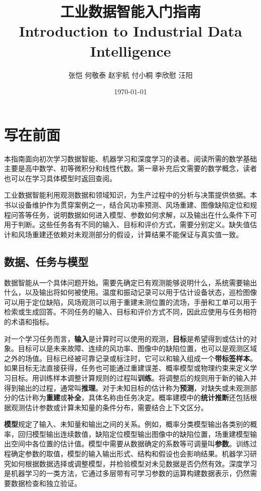 \documentclass[UTF8,11pt,zihao=false,linespread=1.3,openany]{ctexbook}
\title{工业数据智能入门指南 \\ Introduction to Industrial Data Intelligence}
\author{张恺 \quad 何敬泰 \quad 赵宇航 \quad 付小桐 \quad 李欣慰 \quad 汪阳}
\date{\today}
\begin{document}
\maketitle
\frontmatter
\tableofcontents
\chapter*{写在前面}
本指南面向初次学习数据智能、机器学习和深度学习的读者。阅读所需的数学基础主要是高中数学、初等微积分和线性代数。第一章补充后文需要的数学概念，读者也可以在学习具体模型时返回查阅。

工业数据智能利用观测数据和领域知识，为生产过程中的分析与决策提供依据。本书以设备维护作为贯穿案例之一，结合风功率预测、风场重建、图像缺陷定位和规程问答等任务，说明数据如何进入模型、参数如何求解，以及输出在什么条件下可用于判断。这些任务各有不同的输入、目标和评价方式，需要分别定义。缺失值估计和风场重建还依赖对未观测部分的假设，计算结果不能保证与真实值一致。

\section*{数据、任务与模型}
数据智能从一个具体问题开始。需要先确定已有观测能够说明什么，系统需要输出什么，以及输出将如何被使用。温度和振动记录可以用于估计设备状态，巡检图像可以用于定位缺陷，风场观测可以用于重建未测位置的流场，手册和工单可以用于检索或生成回答。不同任务的输入、目标和评价方式不同，因此应使用与任务相符的术语和指标。

对一个学习任务而言，\textbf{输入}是计算时可以使用的观测，\textbf{目标}是希望得到或估计的对象。目标可以是未来故障、连续的风功率、图像中的缺陷位置，也可以是观测区域之外的场值。目标已经被可靠记录或标注时，它可以和输入组成一个\textbf{带标签样本}。如果目标无法直接获得，任务也可能通过重建误差、概率模型或物理约束来定义学习目标。用训练样本调整计算规则的过程叫\textbf{训练}。将调整后的规则用于新的输入并得到输出的过程，通常叫\textbf{推理}。对于未知目标的估计称为\textbf{预测}，对缺失或未观测部分的估计称为\textbf{重建}或\textbf{补全}，具体名称由任务决定。概率建模中的\textbf{统计推断}还包括根据观测估计参数或计算未知量的条件分布，需要结合上下文区分。

\textbf{模型}规定了输入、未知量和输出之间的关系。例如，概率分类模型输出各类别的概率，回归模型输出连续数值，缺陷定位模型输出图像中的缺陷位置，场重建模型输出空间中各位置的估计值。模型中需要从数据确定的系数等可调量叫\textbf{参数}。训练过程确定参数的取值，模型的输入输出形式、结构和假设也会影响结果。机器学习研究如何根据数据选择或调整模型，并检验模型对未见数据是否仍然有效。深度学习是机器学习的一类方法，它通过多层带有可学习参数的运算构建数据表示，仍然需要数据检查和独立验证。
\end{document}
